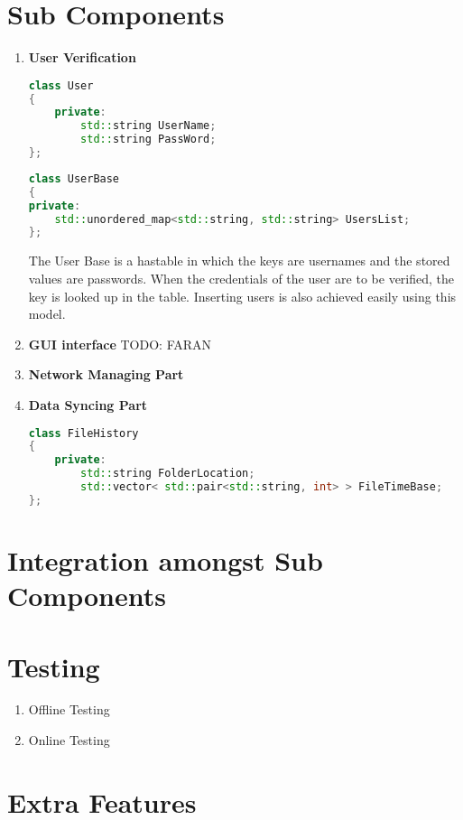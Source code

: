 \documentclass{article}
\begin{document}
	\section{Sub Components}
		\begin{enumerate}
			\item \textbf{User Verification}
			\begin{lstlisting}[language=C++, caption={Class Parameters for User}]
class User
{
	private:
		std::string UserName;
		std::string PassWord;	
};
			\end{lstlisting}
			\begin{lstlisting}[language=C++, caption={Class Parameters for User}]
class UserBase
{
private:
	std::unordered_map<std::string, std::string> UsersList;
};
			\end{lstlisting}
			The User Base is a hastable in which the keys are usernames and the stored values are passwords. When the credentials of the user are to be verified, the key is looked up in the table. Inserting users is also achieved easily using this model.
			
			\item \textbf{GUI interface} 
				\newline
				TODO: FARAN
			\item \textbf{Network Managing Part}
			\item \textbf{Data Syncing Part}
				\newline
				\begin{lstlisting}[language=C++, caption={Class Parameters for File History}]
class FileHistory
{
	private:
		std::string FolderLocation;
		std::vector< std::pair<std::string, int> > FileTimeBase;
};
			\end{lstlisting}
			

		\end{enumerate}
	\section{Integration amongst Sub Components}

	\section{Testing}
		\begin{enumerate}
			\item Offline Testing
			\item Online Testing
		\end{enumerate}

	\section{Extra Features}
\end{document}
